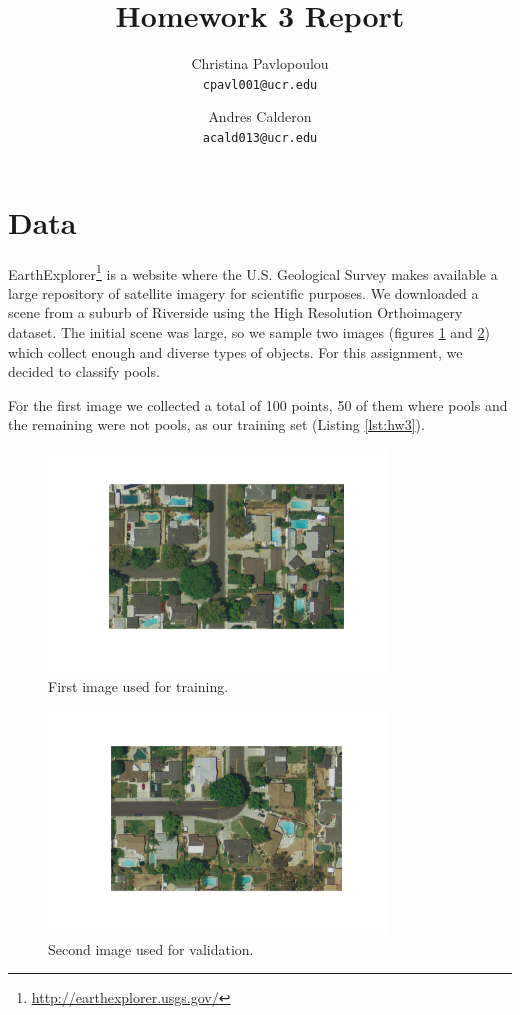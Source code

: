 \documentclass{article}
\title{Homework 3 Report}
\author{
   Christina Pavlopoulou\\
  \small \texttt{cpavl001@ucr.edu}
  \and
   Andres Calderon\\
  \small \texttt{acald013@ucr.edu}
}
\begin{document}
\maketitle

\section{Data}
EarthExplorer\footnote{\url{http://earthexplorer.usgs.gov/}} is a website where the U.S. Geological Survey makes available a large repository of satellite imagery for scientific purposes.  We downloaded a scene from a suburb of Riverside using the High Resolution Orthoimagery dataset.  The initial scene was large, so we sample two images (figures \ref{fig:image1} and \ref{fig:image2}) which collect enough and diverse types of objects.  For this assignment, we decided to classify pools.

For the first image we collected a total of 100 points, 50 of them where pools and the remaining were not pools, as our training set (Listing \ref{lst:hw3}).

\begin{figure}[h]
 \centering
 \includegraphics[trim=10 60 10 50 , clip, width=0.8\textwidth]{../figures/image1.pdf}
 \caption{First image used for training.}
 \label{fig:image1}
\end{figure}

\begin{figure}
 \centering
 \includegraphics[trim=10 60 10 50 , clip, width=0.8\textwidth]{../figures/image2.pdf}
 \caption{Second image used for validation.}
 \label{fig:image2}
\end{figure}
\end{document}
